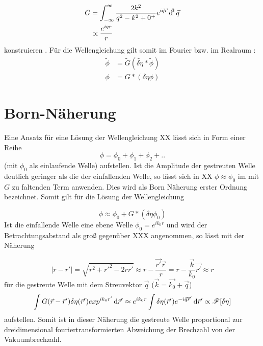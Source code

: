 \begin{align}
G&=\int_{-\infty}^{\infty} \frac{2k^2}{q^2-k^2+0^+} e^{i\vec{q}\vec{r}}\dif^3 \vec{q}\nonumber\\
&\propto\frac{e^{iqr}}{r}
\end{align}
konstruieren \cite{trigg2006}. Für die Wellengleichung gilt somit im Fourier bzw. im Realraum \cite{cowley1995,thibault2007}:
\begin{align}
\tilde{\phi}&=\tilde{G}(\tilde{\delta \eta} \ast \tilde{\phi})\\
\phi&={G}\ast({\delta \eta}  {\phi})
\end{align}

\section{Born-Näherung}
Eine Ansatz für eine Lösung der Wellengleichung XX lässt sich in Form einer Reihe
\begin{equation}
\phi=\phi_0+\phi_1+\phi_2+..
\end{equation}
(mit $\phi_0$ als einlaufende Welle) aufstellen. Ist die Amplitude der gestreuten Welle deutlich geringer als die der einfallenden Welle, so lässt sich in XX $\phi\approx\phi_0$ im mit $G$ zu faltenden Term anwenden. Dies wird als Born Näherung erster Ordnung bezeichnet. Somit gilt für die Lösung der Wellengleichung

\begin{equation}
\phi\approx\phi_0+G\ast({\delta \eta} \phi_0)
\end{equation}
Ist die einfallende Welle eine ebene Welle $\phi_0=e^{ik_0r}$ und wird der Betrachtungsabstand als groß gegenüber XXX angenommen, so lässt mit der Näherung

\begin{equation}
|r-r'|=\sqrt{r^2+r'^2-2rr'}\approx r-\frac{\vec{r'}\vec{r}}{r}=r-\frac{\vec{k}}{k_0}\vec{r'}\approx r
\end{equation}
für die gestreute Welle mit dem Streuvektor $\vec{q}$ ($\vec{k}=\vec{k_0}+\vec{q}$)
\begin{equation}
\int G(\vec{r}-\vec{r}')\delta\eta(\vec{r}') exp^{ik_0r'}  \dif \vec{r}'\approx e^{ik_0r}\int \delta\eta(\vec{r}')e^{-i\vec{q}\vec{r}'}\dif \vec{r}'\propto \mathscr{F}[\delta\eta]
\end{equation}
aufstellen. Somit ist in dieser Näherung die gestreute Welle proportional zur dreidimensional fouriertransformierten Abweichung der Brechzahl von der Vakuumbrechzahl.




